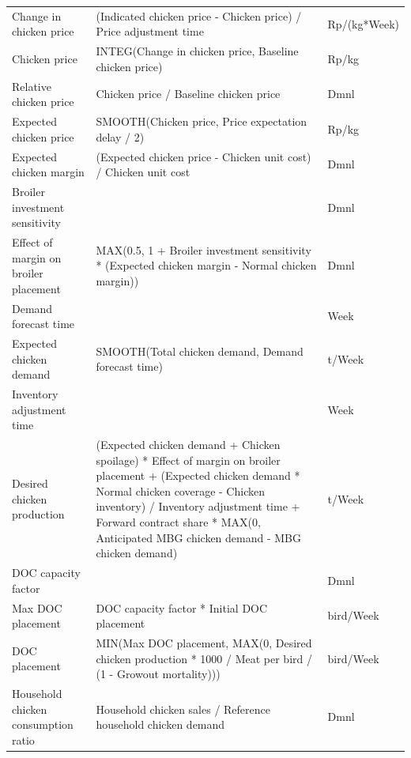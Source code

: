 \documentclass[10pt,twocolumn,a4paper]{article}
\begin{document}
\begin{longtable}{>{\raggedright\arraybackslash}p{4.2cm}>{\raggedright\arraybackslash\ttfamily}p{8.9cm}>{\raggedright\arraybackslash}p{2.4cm}}
Change in chicken price & (Indicated chicken price - Chicken price) / Price adjustment time & Rp/(kg*Week) \\
Chicken price & INTEG(Change in chicken price, Baseline chicken price) & Rp/kg \\
Relative chicken price & Chicken price / Baseline chicken price & Dmnl \\
Expected chicken price & SMOOTH(Chicken price, Price expectation delay / 2) & Rp/kg \\
Expected chicken margin & (Expected chicken price - Chicken unit cost) / Chicken unit cost & Dmnl \\
Broiler investment sensitivity & 1 & Dmnl \\
Effect of margin on broiler placement & MAX(0.5, 1 + Broiler investment sensitivity * (Expected chicken margin - Normal chicken margin)) & Dmnl \\
Demand forecast time & 4 & Week \\
Expected chicken demand & SMOOTH(Total chicken demand, Demand forecast time) & t/Week \\
Inventory adjustment time & 2 & Week \\
Desired chicken production & (Expected chicken demand + Chicken spoilage) * Effect of margin on broiler placement + (Expected chicken demand * Normal chicken coverage - Chicken inventory) / Inventory adjustment time + Forward contract share * MAX(0, Anticipated MBG chicken demand - MBG chicken demand) & t/Week \\
DOC capacity factor & 1.2 & Dmnl \\
Max DOC placement & DOC capacity factor * Initial DOC placement & bird/Week \\
DOC placement & MIN(Max DOC placement, MAX(0, Desired chicken production * 1000 / Meat per bird / (1 - Growout mortality))) & bird/Week \\
Household chicken consumption ratio & Household chicken sales / Reference household chicken demand & Dmnl \\
\bottomrule
\end{longtable}
\normalsize
\end{document}
